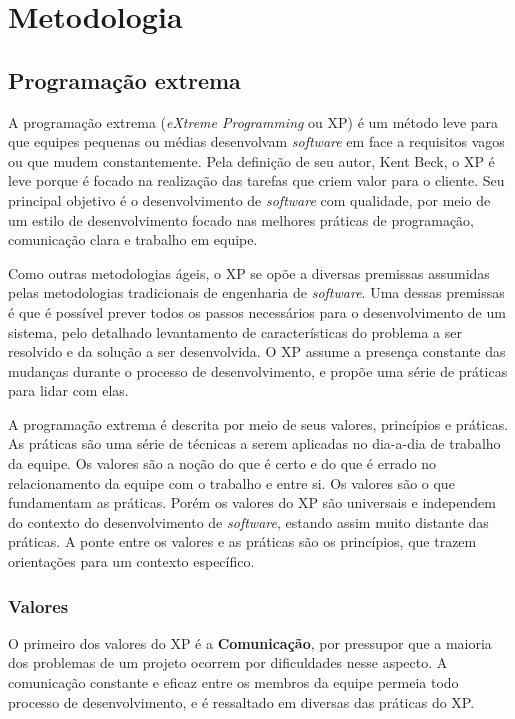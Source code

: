 
\chapter{Metodologia}

\section{Programação extrema}
  A programação extrema (\textit{eXtreme Programming} ou XP) é um método leve para que equipes pequenas ou médias desenvolvam \textit{software} em face a requisitos vagos ou que mudem constantemente\cite{beck04}. Pela definição de seu autor, Kent Beck, o XP é leve porque é focado na realização das tarefas que criem valor para o cliente. Seu principal objetivo é o desenvolvimento de \textit{software} com qualidade, por meio de um estilo de desenvolvimento focado nas melhores práticas de programação, comunicação clara e trabalho em equipe.

  Como outras metodologias ágeis, o XP se opõe a diversas premissas assumidas pelas metodologias tradicionais de engenharia de \textit{software}. Uma dessas premissas é que é possível prever todos os passos necessários para o desenvolvimento de um sistema, pelo detalhado levantamento de características do problema a ser resolvido e da solução a ser desenvolvida. O XP assume a presença constante das mudanças durante o processo de desenvolvimento, e propõe uma série de práticas para lidar com elas.

  A programação extrema é descrita por meio de seus valores, princípios e práticas. As práticas são uma série de técnicas a serem aplicadas no dia-a-dia de trabalho da equipe. Os valores são a noção do que é certo e do que é errado no relacionamento da equipe com o trabalho e entre si. Os valores são o que fundamentam as práticas. Porém os valores do XP são universais e independem do contexto do desenvolvimento de \textit{software}, estando assim muito distante das práticas. A ponte entre os valores e as práticas são os princípios, que trazem orientações para um contexto específico.

  \subsection{Valores}
    O primeiro dos valores do XP é a \textbf{Comunicação}, por pressupor que a maioria dos problemas de um projeto ocorrem por dificuldades nesse aspecto. A comunicação constante e eficaz entre os membros da equipe permeia todo processo de desenvolvimento, e é ressaltado em diversas das práticas do XP.

